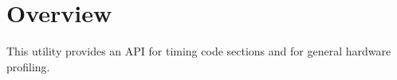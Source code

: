 \section{Overview}

This utility provides an API for timing code sections and
for general hardware profiling.
